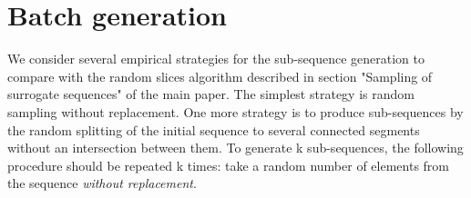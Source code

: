 \documentclass[sigconf]{acmart}
\begin{document}









\appendix

\section{Batch generation} \label{app-sec-bg}

We consider several empirical strategies for the sub-sequence generation to compare with the random slices algorithm described in section "Sampling of surrogate sequences" of the main paper.
The simplest strategy is random sampling without replacement.
One more strategy is to produce sub-sequences by the random splitting of the initial sequence to several connected segments without an intersection between them. To generate k sub-sequences, the following procedure should be repeated k times: take a random number of elements from the sequence \textit{without replacement}.
\end{document}
